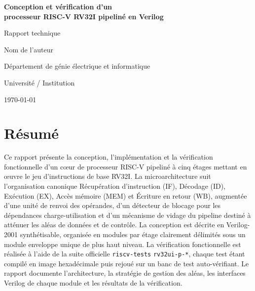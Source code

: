 \documentclass[11pt,a4paper,oneside]{report}
\begin{document}

\begin{titlepage}
  \centering
  \vspace*{2.5cm}
  {\Large\bfseries Conception et vérification d'un\\[0.3em]
   processeur RISC-V RV32I pipeliné en Verilog\par}
  \vspace{2cm}
  {\large Rapport technique\par}
  \vspace{2cm}
  {\large Nom de l'auteur\par}
  {\normalsize Département de génie électrique et informatique\par}
  {\normalsize Université / Institution\par}
  \vspace{2cm}
  {\normalsize \today\par}
  \vfill
\end{titlepage}

\chapter*{Résumé}
Ce rapport présente la conception, l'implémentation et la
vérification fonctionnelle d'un c\oe{}ur de processeur RISC-V pipeliné
à cinq étages mettant en \oe{}uvre le jeu d'instructions de base
RV32I. La microarchitecture suit l'organisation canonique
Récupération d'instruction (IF), Décodage (ID), Exécution (EX),
Accès mémoire (MEM) et Écriture en retour (WB), augmentée d'une
unité de renvoi des opérandes, d'un détecteur de blocage pour les
dépendances charge-utilisation et d'un mécanisme de vidage du
pipeline destiné à atténuer les aléas de données et de contrôle.
La conception est décrite en Verilog-2001 synthétisable, organisée
en modules par étage clairement délimités sous un module
enveloppe unique de plus haut niveau. La vérification
fonctionnelle est réalisée à l'aide de la suite officielle
\texttt{riscv-tests} \texttt{rv32ui-p-*}, chaque test étant compilé
en image hexadécimale puis rejoué sur un banc de test
auto-vérifiant. Le rapport documente l'architecture, la stratégie
de gestion des aléas, les interfaces Verilog de chaque module et
les résultats de la vérification.

\tableofcontents

\clearpage
{}
\end{document}
